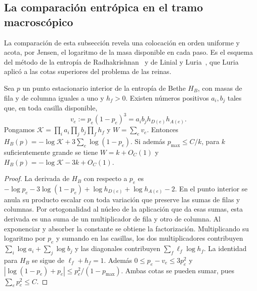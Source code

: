 \subsection{La comparación entrópica en el tramo macroscópico}
La comparación de esta subsección revela una colocación en orden uniforme y acota, por Jensen, el
logaritmo de la masa disponible en cada paso. Es el esquema del método de la entropía de
Radhakrishnan~\cite{radhakrishnan} y de Linial y Luria~\cite{linialluria}, que
Luria~\cite{luria} aplicó a las cotas superiores del problema de las reinas.

\begin{lema}\label{coste-vacancias}
Sea $p$ un punto estacionario interior de la entropía de Bethe $H_B$, con masas de fila y de columna
iguales a uno y $h_f>0$. Existen números positivos $a_i,b_j$ tales que, en toda casilla disponible,
\[
 v_e:=p_e(1-p_e)^3=a_i b_j h_{D(e)}h_{A(e)} .
\]
Pongamos $\mathcal K=\prod_i a_i\prod_j b_j\prod_f h_f$ y $W=\sum_e v_e$. Entonces
$H_B(p)=-\log\mathcal K+3\sum_e\log(1-p_e)$. Si además $p_{\max}\le C/k$, para $k$
suficientemente grande se tiene $W=k+O_C(1)$ y $H_B(p)=-\log\mathcal K-3k+O_C(1)$.
\end{lema}
\begin{proof}
La derivada de $H_B$ con respecto a $p_e$ es
$-\log p_e-3\log(1-p_e)+\log h_{D(e)}+\log h_{A(e)}-2$.
En el punto interior se anula su producto escalar con toda variación que preserve las sumas de filas y
columnas. Por ortogonalidad al núcleo de la aplicación que da esas sumas, esta derivada es una suma de
un multiplicador de fila y otro de columna. Al exponenciar y absorber la constante se obtiene la
factorización. Multiplicando su logaritmo por $p_e$ y sumando en las casillas, los dos multiplicadores
contribuyen $\sum_i\log a_i+\sum_j\log b_j$ y las diagonales contribuyen $\sum_f\ell_f\log h_f$. La
identidad para $H_B$ se sigue de $\ell_f+h_f=1$. Además $0\le p_e-v_e\le3p_e^2$ y
$|\log(1-p_e)+p_e|\le p_e^2/(1-p_{\max})$. Ambas cotas se pueden sumar, pues $\sum_e p_e^2\le C$.
\end{proof}

